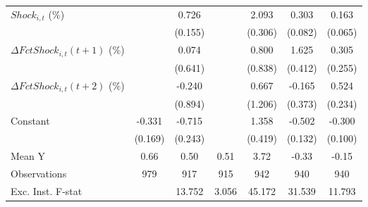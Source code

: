 {\begin{tabular}{l*{6}{c}}
\addlinespace
$ Shock_{i,t}$ (\%) &                     &       0.726\sym{***}&                     &       2.093\sym{***}&       0.303\sym{***}&       0.163\sym{**} \\
                    &                     &     (0.155)         &                     &     (0.306)         &     (0.082)         &     (0.065)         \\
\addlinespace
$ \Delta FctShock_{i,t}(t+1)$ (\%)&                     &       0.074         &                     &       0.800         &       1.625\sym{***}&       0.305         \\
                    &                     &     (0.641)         &                     &     (0.838)         &     (0.412)         &     (0.255)         \\
\addlinespace
$ \Delta FctShock_{i,t}(t+2)$ (\%)&                     &      -0.240         &                     &       0.667         &      -0.165         &       0.524\sym{**} \\
                    &                     &     (0.894)         &                     &     (1.206)         &     (0.373)         &     (0.234)         \\
\addlinespace
Constant            &      -0.331\sym{*}  &      -0.715\sym{***}&                     &       1.358\sym{***}&      -0.502\sym{***}&      -0.300\sym{***}\\
                    &     (0.169)         &     (0.243)         &                     &     (0.419)         &     (0.132)         &     (0.100)         \\
\midrule
Mean Y              &        0.66         &        0.50         &        0.51         &        3.72         &       -0.33         &       -0.15         \\
Observations        &         979         &         917         &         915         &         942         &         940         &         940         \\
Exc. Inst. F-stat   &                     &      13.752         &       3.056         &      45.172         &      31.539         &      11.793         \\
\bottomrule
\end{tabular}
}
